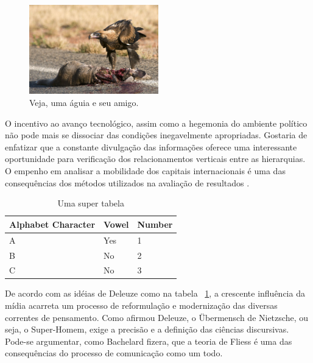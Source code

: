 \documentclass[font=plain,chapter=TITLE,section=Title,espaco=duplo,tocpage=plain,appendix=Name,floatnumber=continuous]{abnt}
\begin{document}
\begin{figure}[h!]
  \centering
  \includegraphics[width=0.5\textwidth]{img/eagle.jpg}
  \caption[Uma retumbante águia]{Veja, uma águia e seu amigo.}
\end{figure}

O incentivo ao avanço tecnológico, assim como a hegemonia do ambiente
político não pode mais se dissociar das condições inegavelmente
apropriadas. Gostaria de enfatizar que a constante divulgação das
informações oferece uma interessante oportunidade para verificação dos
relacionamentos verticais entre as hierarquias. O empenho em analisar a
mobilidade dos capitais internacionais é uma das consequências dos métodos
utilizados na avaliação de resultados \cite{semolini2002support}.

\begin{table}[h!b!p!]
\centering
\begin{tabular}{|l|l|l|}
\hline
Alphabet Character & Vowel & Number \\
\hline
A & Yes & 1 \\
B & No & 2 \\
C & No & 3 \\
\hline
\end{tabular}
\caption{Uma super tabela}
\label{tab:seila}
\end{table}

De acordo com as idéias de Deleuze como na tabela ~\ref{tab:seila}, a crescente
influência da mídia acarreta um processo de reformulação e modernização das
diversas correntes de pensamento.  Como afirmou Deleuze, o Übermensch de
Nietzsche, ou seja, o Super-Homem, exige a precisão e a definição das ciências
discursivas.  Pode-se argumentar, como Bachelard fizera, que a teoria de Fliess
é uma das consequências do processo de comunicação como um todo.
\end{document}
